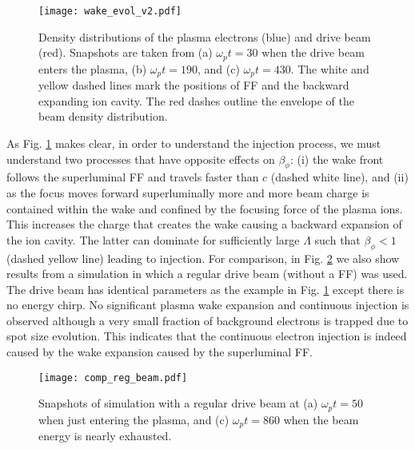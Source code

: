 \documentclass[
aps,
prl,
reprint,
superscriptaddress,
amsmath,
amssymb,
showpacs
]{revtex4-2}
\begin{document}
\begin{figure}[htbp]
\texttt{[image: wake\_evol\_v2.pdf]}
\caption{\label{fig:wake_evol}
Density distributions of the plasma electrons (blue) and drive beam (red). Snapshots are taken from (a) $\omega_p t=30$ when the drive beam enters the plasma, (b) $\omega_p t=190$, and (c) $\omega_p t=430$. The white and yellow dashed lines mark the positions of FF and the backward expanding ion cavity. The red dashes outline the envelope of the beam density distribution.}
\end{figure}

As Fig. \ref{fig:wake_evol} makes clear, in order to understand the injection process, we must understand two processes that have opposite effects on $\beta_\phi$: (i) the wake front follows the superluminal FF and travels faster than $c$ (dashed white line), and (ii) as the focus moves forward superluminally more and more beam charge is contained within the wake and confined by the focusing force of the plasma ions. This increases the charge that creates the wake causing a backward expansion of the ion cavity. The latter can dominate for sufficiently large $\Lambda$ such that $\beta_\phi<1$ (dashed yellow line) leading to injection.
For comparison, in Fig. \ref{fig:comp_reg_beam} we also show results from a simulation in which a regular drive beam (without a FF) was used. The drive beam has identical parameters as the example in Fig. \ref{fig:wake_evol} except there is no energy chirp. No significant plasma wake expansion and continuous injection is observed although a very small fraction of background electrons is trapped due to spot size evolution. This indicates that the continuous electron injection is indeed caused by the wake expansion caused by the superluminal FF.

\begin{figure}[htbp]
\centering
\texttt{[image: comp\_reg\_beam.pdf]}
\caption{Snapshots of simulation with a regular drive beam at (a) $\omega_pt=50$ when just entering the plasma, and (c) $\omega_pt=860$ when the beam energy is nearly exhausted.}
\label{fig:comp_reg_beam}
\end{figure}
\end{document}

